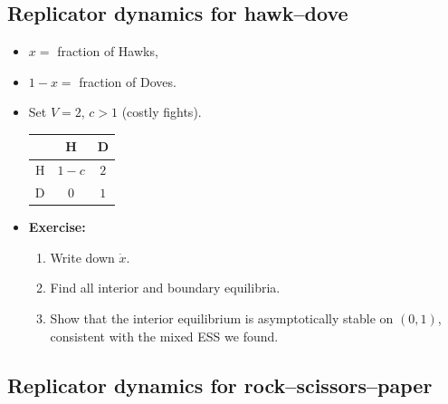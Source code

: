 \documentclass[20pt]{extarticle}
\begin{document}
\subsection*{Replicator dynamics for hawk--dove}

\begin{itemize}
\item $x = $ fraction of Hawks,
\item $1-x = $ fraction of Doves.
\item Set $V=2$, $c > 1$ (costly fights).
\begin{center}
\begin{tabular}{|c||c|c|}
\hline
 & H & D \\
\hline\hline
H & $1-c$ & $2$ \\
\hline
D & $0$ & $1$ \\
\hline
\end{tabular}
\end{center}

\item \textbf{Exercise:}
	\begin{enumerate}
	\item Write down $\dot x$.
	\item Find all interior and boundary equilibria.
	\item Show that the interior equilibrium
	is asymptotically stable on $(0,1)$, consistent with the mixed ESS we found.
	\end{enumerate}
\end{itemize}

\subsection*{Replicator dynamics for rock--scissors--paper}
\end{document}
